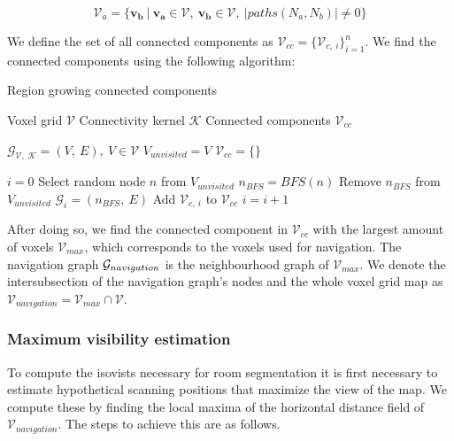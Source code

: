 \begin{equation}
    \label{eq:connected_components_03}
\mathcal{V}_a=\{\boldsymbol{v_b}\ |\ \boldsymbol{v_a} \in \mathcal{V},\ \boldsymbol{v_b} \in \mathcal{V},\ |paths(N_a, N_b)| \neq 0\}
\end{equation}

We define the set of all connected components as \(\mathcal{V}_{cc}=\{\mathcal{V}_{c,\ i}\}_{i=1}^n\). We find the connected components using the following algorithm:

\begin{algorithm}
    \caption{Region growing connected components}\label{alg:cap}
    \begin{algorithmic}

    \Require \quad Voxel grid \(\mathcal{V}\)
    \Require \quad Connectivity kernel \(\mathcal{K}\)
    \Ensure \quad Connected components \(\mathcal{V}_{cc}\)

    \State \(\mathcal{G}_{\mathcal{V},\ \mathcal{K}} = (V,\ E),\ V \in \mathcal{V}\) 
    \State \(V_{unvisited} = V\)
    \State \(\mathcal{V}_{cc} = \{\}\)
    
    \State \(i = 0\)
        \State Select random node \(n\) from \(V_{unvisited}\)
        \State \(n_{BFS} = BFS(n)\) 
        \State Remove \(n_{BFS}\) from \(V_{unvisited}\)
        \State \(\mathcal{G}_i = (n_{BFS},\ E)\)
        \State Add \(\mathcal{V}_{c,\ i}\) to \(\mathcal{V}_{cc}\)
        \State \(i = i + 1\)
    \EndWhile
    \end{algorithmic}
\end{algorithm}

After doing so, we find the connected component in \(\mathcal{V}_{cc}\) with the largest amount of voxels \(\mathcal{V}_{max}\), which corresponds to the voxels used for navigation. The navigation graph \(\mathcal{G}_{navigation}\) is the neighbourhood graph of \(\mathcal{V}_{max}\). We denote the intersubsection of the navigation graph's nodes and the whole voxel grid map as \(\mathcal{V}_{navigation} = \mathcal{V}_{max} \cap \mathcal{V}\).

\subsubsection{Maximum visibility estimation}
To compute the isovists necessary for room segmentation it is first necessary to estimate hypothetical scanning positions that maximize the view of the map. We compute these by finding the local maxima of the horizontal distance field of \(\mathcal{V}_{navigation}\). The steps to achieve this are as follows. 

